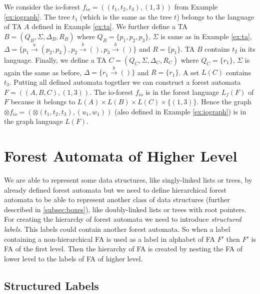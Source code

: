 \bexmp
We consider the io-forest $f_{io}=((t_1,t_2,t_3), (1,3))$ from Example \ref{ex:iograph}.
The tree $t_1$ (which is the same as the tree $t$) belongs to the language of TA $A$
defined in Example \ref{ex:ta}.
We further define a TA $B=(Q_B,\Sigma, \Delta_B, R_B)$ where $Q_B=\{p_1,p_2,p_3\}$,
$\Sigma$ is same as in Example \ref{ex:ta},
$\Delta=\{p_1 \xrightarrow{a} (p_2,p_3),
p_2 \xrightarrow{b} (),
p_3 \xrightarrow{b} ()\}$
and $R=\{p_1\}$.
TA $B$ contains $t_2$ in its language.
Finally, we define a TA $C=(Q_C,\Sigma, \Delta_C, R_C)$ where $Q_C=\{r_1\}$,
$\Sigma$ is again the same as before,
$\Delta= \{r_1 \xrightarrow{b} ()\}$
and $R=\{r_1\}$.
A set $L(C)$ contains $t_3$.
Putting all defined automata together we can construct a forest automata $F=((A,B,C),(1,3))$.
The io-forest $f_{io}$ is in the forest language $L_f(F)$ of $F$ because it belongs
to $L(A) \times L(B) \times L(C) \times \{(1,3)\}$.
Hence the graph $\otimes f_{io} = (\otimes (t_1,t_2,t_3),(u_1,w_1))$
(also defined in Example \ref{ex:iograph}) is in the graph language $L(F)$.
\eexmp

\section{Forest Automata of Higher Level}
\label{sec:fah}

We are able to represent some data structures, like singly-linked lists or trees, by already defined forest automata
but we need to define hierarchical forest automata to be able to represent
another class of data structures (further described in \ref{subsec:boxes}), like doubly-linked lists or trees with root pointers.
For creating the hierarchy of forest automata we need to introduce \emph{structured labels}.
This labels could contain another forest automata.
So when a label containing a non-hierarchical FA is used as a label
in alphabet of FA $F'$ then $F'$ is FA of the first level.
Then the hierarchy of FA is created by nesting the FA of lower level
to the labels of FA of higher level.

\subsection{Structured Labels}

